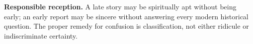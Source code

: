 \begin{studyframe}
\textbf{Responsible reception.} A late story may be spiritually apt without
being early; an early report may be sincere without answering every modern
historical question. The proper remedy for confusion is classification, not
either ridicule or indiscriminate certainty.
\end{studyframe}
